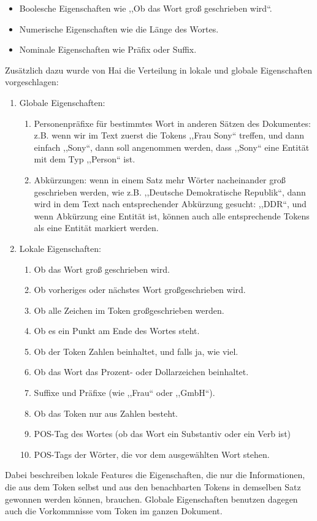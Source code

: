 \begin{itemize}
\item Boolesche Eigenschaften wie ,,Ob das Wort groß geschrieben wird``.
\item Numerische Eigenschaften wie die Länge des Wortes.
\item Nominale Eigenschaften wie Präfix oder Suffix.
\end{itemize}
Zusätzlich dazu wurde von Hai\cite{chieu2002named} die Verteilung in lokale und globale Eigenschaften vorgeschlagen:

\begin{enumerate}
\item Globale Eigenschaften:
\begin{enumerate}
\item Personenpräfixe für bestimmtes Wort in anderen Sätzen des Dokumentes: z.B. wenn wir im Text zuerst die Tokens ,,Frau Sony`` treffen, und dann einfach ,,Sony``, dann soll angenommen werden, dass ,,Sony`` eine Entität mit dem Typ ,,Person`` ist.
\item Abkürzungen: wenn in einem Satz mehr Wörter nacheinander groß geschrieben werden, wie z.B. ,,Deutsche Demokratische Republik``, dann wird in dem Text nach entsprechender Abkürzung gesucht: ,,DDR``, und wenn Abkürzung eine Entität ist, können auch alle entsprechende Tokens als eine Entität markiert werden.
\end{enumerate}
\item Lokale Eigenschaften:
\begin{enumerate}
\item Ob das Wort groß geschrieben wird.
\item Ob vorheriges oder nächstes Wort großgeschrieben wird.
\item Ob alle Zeichen im Token großgeschrieben werden.
\item Ob es ein Punkt am Ende des Wortes steht.
\item Ob der Token Zahlen beinhaltet, und falls ja, wie viel.
\item Ob das Wort das Prozent- oder Dollarzeichen beinhaltet.
\item Suffixe und Präfixe (wie ,,Frau`` oder ,,GmbH``).
\item Ob das Token nur aus Zahlen besteht.
\item POS-Tag des Wortes (ob das Wort ein Substantiv oder ein Verb ist)
\item POS-Tags der Wörter, die vor dem ausgewählten Wort stehen.
\end{enumerate}
\end{enumerate}
Dabei beschreiben lokale Features die Eigenschaften, die nur die Informationen, die aus dem Token selbst und aus den benachbarten Tokens in demselben Satz gewonnen werden können, brauchen. Globale Eigenschaften benutzen dagegen auch die Vorkommnisse vom Token im ganzen Dokument.

